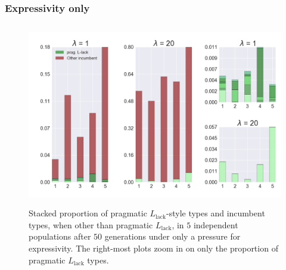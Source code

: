 \documentclass[a4paper, 11pt]{article}
\newcommand{\mylang}[1]{\ensuremath{L_{\text{#1}}}\xspace} %
\newcommand{\Llack}{\mylang{lack}}
\begin{document}

\subsubsection{Expressivity only} 
\begin{figure}
\centering
\includegraphics[width=\textwidth,height=8cm, keepaspectratio]{./plots/fig1-onlyr}
\caption{Stacked proportion of pragmatic $\Llack$-style types and incumbent types, when other than pragmatic $\Llack$, in $5$ independent populations after $50$ generations under only a pressure for expressivity. The right-most plots zoom in on only the proportion of pragmatic $\Llack$ types.}
\label{fig:only-R}
\end{figure}
\end{document}
